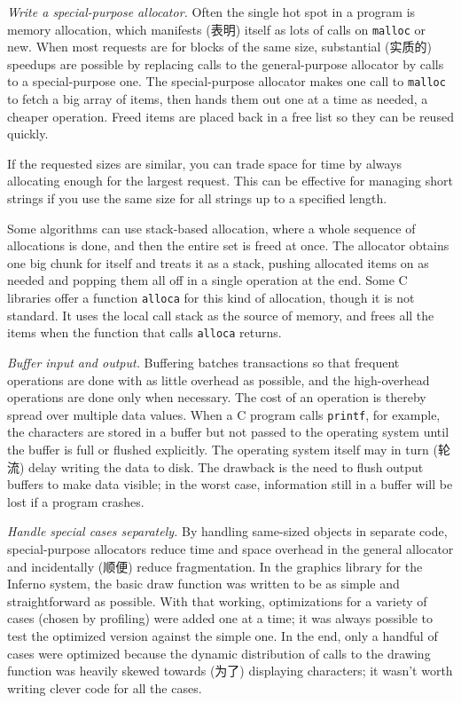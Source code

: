 \emph{Write a special-purpose allocator.} Often the single hot spot in a
program is memory allocation, which manifests (表明) itself as lots of
calls on \verb'malloc' or new. When most requests are for blocks of the
same size, substantial (实质的) speedups are possible by replacing calls to
the general-purpose allocator by calls to a special-purpose one.  The
special-purpose allocator makes one call to \verb'malloc' to fetch a big
array of items, then hands them out one at a time as needed, a cheaper
operation. Freed items are placed back in a free list so they can be reused
quickly.

If the requested sizes are similar, you can trade space for time by always
allocating enough for the largest request. This can be effective for
managing short strings if you use the same size for all strings up to a
specified length.

Some algorithms can use stack-based allocation, where a whole sequence of
allocations is done, and then the entire set is freed at once. The
allocator obtains one big chunk for itself and treats it as a stack,
pushing allocated items on as needed and popping them all off in a single
operation at the end. Some C libraries offer a function \verb'alloca' for
this kind of allocation, though it is not standard. It uses the local call
stack as the source of memory, and frees all the items when the function
that calls \verb'alloca' returns.

\emph{Buffer input and output.} Buffering batches transactions so that
frequent operations are done with as little overhead as possible, and the
high-overhead operations are done only when necessary. The cost of an
operation is thereby spread over multiple data values. When a C program
calls \verb'printf', for example, the characters are stored in a buffer but
not passed to the operating system until the buffer is full or flushed
explicitly. The operating system itself may in turn (轮流) delay writing
the data to disk. The drawback is the need to flush output buffers to make
data visible; in the worst case, information still in a buffer will be lost
if a program crashes.

\emph{Handle special cases separately.} By handling same-sized objects in
separate code, special-purpose allocators reduce time and space overhead in
the general allocator and incidentally (顺便) reduce fragmentation. In the
graphics library for the Inferno system, the basic draw function was
written to be as simple and straightforward as possible. With that working,
optimizations for a variety of cases (chosen by profiling) were added one
at a time; it was always possible to test the optimized version against the
simple one.  In the end, only a handful of cases were optimized because the
dynamic distribution of calls to the drawing function was heavily skewed
towards (为了) displaying characters; it wasn't worth writing clever code
for all the cases.

